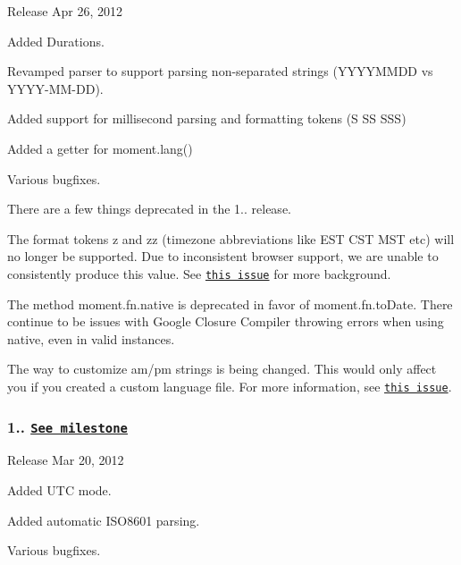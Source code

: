 \begin{DoxyItemize}
\item Release Apr 26, 2012
\end{DoxyItemize}

Added Durations.

Revamped parser to support parsing non-\/separated strings (Y\+Y\+Y\+Y\+M\+M\+DD vs Y\+Y\+Y\+Y-\/\+M\+M-\/\+DD).

Added support for millisecond parsing and formatting tokens (S SS S\+SS)

Added a getter for {\ttfamily moment.\+lang()}

Various bugfixes.

There are a few things deprecated in the 1.. release.


\begin{DoxyEnumerate}
\item The format tokens {\ttfamily z} and {\ttfamily zz} (timezone abbreviations like E\+ST C\+ST M\+ST etc) will no longer be supported. Due to inconsistent browser support, we are unable to consistently produce this value. See \href{https://github.com/timrwood/moment/issues/162}{\tt this issue} for more background.
\item The method {\ttfamily moment.\+fn.\+native} is deprecated in favor of {\ttfamily moment.\+fn.\+to\+Date}. There continue to be issues with Google Closure Compiler throwing errors when using {\ttfamily native}, even in valid instances.
\item The way to customize am/pm strings is being changed. This would only affect you if you created a custom language file. For more information, see \href{https://github.com/timrwood/moment/pull/222}{\tt this issue}.
\end{DoxyEnumerate}

\subsubsection*{1.. \href{https://github.com/timrwood/moment/issues?milestone=10&page=1&state=closed}{\tt See milestone}}


\begin{DoxyItemize}
\item Release Mar 20, 2012
\end{DoxyItemize}

Added U\+TC mode.

Added automatic I\+S\+O8601 parsing.

Various bugfixes.

